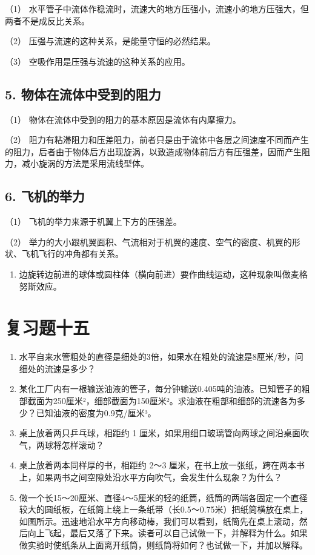 （1）
水平管子中流体作稳流时，流速大的地方压强小，流速小的地方压强大，但两者不是成反比关系。

（2） 压强与流速的这种关系，是能量守恒的必然结果。

（3） 空吸作用是压强与流速的这种关系的应用。

\subsection{5.
物体在流体中受到的阻力}\label{ux7269ux4f53ux5728ux6d41ux4f53ux4e2dux53d7ux5230ux7684ux963bux529b-1}

（1） 物体在流体中受到的阻力的基本原因是流体有内摩擦力。

（2）
阻力有粘滞阻力和压差阻力，前者只是由于流体中各层之间速度不同而产生的阻力，后者由于物体后方出现旋涡，以致造成物体前后方有压强差，因而产生阻力，减小旋涡的方法是采用流线型体。

\subsection{6. 飞机的举力}\label{ux98deux673aux7684ux4e3eux529b-1}

（1） 飞机的举力来源于机翼上下方的压强差。

（2）
举力的大小跟机翼面积、气流相对于机翼的速度、空气的密度、机翼的形状、飞机飞行的冲角都有关系。

\begin{enumerate}
\def\labelenumi{\arabic{enumi}.}
\setcounter{enumi}{6}
\tightlist
\item
  边旋转边前进的球体或圆柱体（横向前进）要作曲线运动，这种现象叫做麦格努斯效应。
\end{enumerate}

\section{复习题十五}\label{ux590dux4e60ux9898ux5341ux4e94}

\begin{enumerate}
\def\labelenumi{\arabic{enumi}.}
\item
  水平自来水管粗处的直径是细处的3倍，如果水在粗处的流速是8厘米/秒，问细处的流速是多少？
\item
  某化工厂内有一根输送油液的管子，每分钟输送0.405吨的油液。已知管子的粗部截面为250厘米²，细部截面为150厘米²。求油液在粗部和细部的流速各为多少？已知油液的密度为0.9克/厘米³。
\item
  桌上放着两只乒乓球，相距约 1
  厘米，如果用细口玻璃管向两球之间沿桌面吹气，两球将怎样滚动？
\item
  桌上放着两本同样厚的书，相距约 2～3
  厘米，在书上放一张纸，跨在两本书上，如果两书之间空隙处沿水平方向吹气，会发生什么现象？为什么？
\item
  做一个长15～20厘米、直径4～5厘米的轻的纸筒，纸筒的两端各固定一个直径较大的圆纸板，在纸筒上绕上一条纸带（长0.5～0.75米）把纸筒横放在桌上，如图所示。迅速地沿水平方向移动棒，我们可以看到，纸筒先在桌上滚动，然后向上飞起，最后又落了下来。读者可以自己试做一下，并解释为什么。如果做实验时使纸条从上面离开纸筒，则纸筒将如何？也试做一下，并加以解释。
\end{enumerate}

